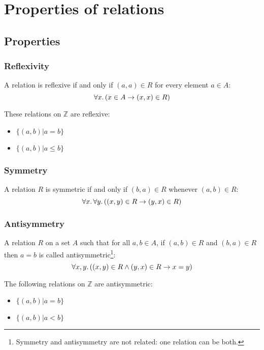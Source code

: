 \section{Properties of relations}
\subsection{Properties}
\subsubsection{Reflexivity}
A relation is reflexive if and only if \((a, a) \in R\) for every element \(a \in A\):
\begin{equation*}
    \forall x \ldotp (x \in A \rightarrow (x, x) \in R)
\end{equation*}
\begin{examples}
    These relations on \(\mathbb{Z}\) are reflexive:
    \begin{itemize}
        \item \(\{(a, b) | a = b\}\)
        \item \(\{(a, b) | a \leq b\}\)
    \end{itemize}
\end{examples}

\subsubsection{Symmetry}
A relation \(R\) is symmetric if and only if \((b, a) \in R\) whenever \((a, b) \in R\):
\begin{equation*}
    \forall x\ldotp \forall y\ldotp ((x, y) \in R \rightarrow (y, x) \in R)
\end{equation*}

\subsubsection{Antisymmetry}
A relation \(R\) on a set \(A\) such that for all \(a, b \in A\), if \((a, b) \in R\) and \((b, a) \in R\) then \(a = b\) is called antisymmetric\footnote{Symmetry and antisymmetry are not related: one relation can be both.}:
\begin{equation*}
    \forall x, y \ldotp ((x, y) \in R \land (y, x) \in R \rightarrow x = y)
\end{equation*}
\begin{examples}
    The following relations on \(\mathbb{Z}\) are antisymmetric:
    \begin{itemize}
        \item \(\{(a, b) | a = b\}\)
        \item \(\{(a, b) | a < b\}\)
    \end{itemize}
\end{examples}

